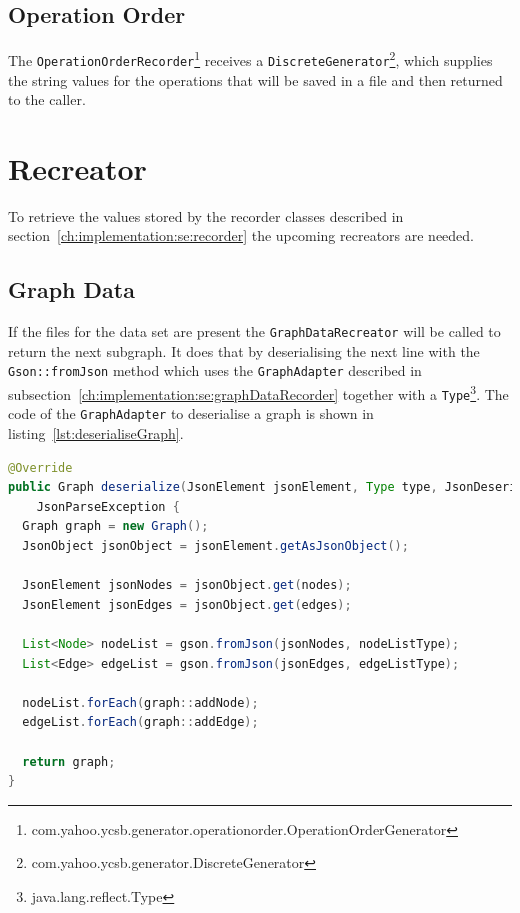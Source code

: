 \subsection{Operation Order}
\label{ch:implementation:se:operationOrderRecorder}
The \texttt{OperationOrderRecorder}\footnote{com.yahoo.ycsb.generator.operationorder.OperationOrderGenerator} receives a \texttt{DiscreteGenerator}\footnote{com.yahoo.ycsb.generator.DiscreteGenerator},
which supplies the string values for the operations that will be saved in a file and then returned to the caller.

\section{Recreator}
\label{ch:implementation:se:recreator}
To retrieve the values stored by the recorder classes described in section~\ref{ch:implementation:se:recorder} the upcoming recreators are needed.

\subsection{Graph Data}
If the files for the data set are present the \texttt{GraphDataRecreator} will be called to return the next subgraph.
It does that by deserialising the next line with the \texttt{Gson::fromJson} method which uses the \texttt{GraphAdapter} described in subsection~\ref{ch:implementation:se:graphDataRecorder} together with a \texttt{Type}\footnote{java.lang.reflect.Type}.
The code of the \texttt{GraphAdapter} to deserialise a graph is shown in listing~\ref{lst:deserialiseGraph}.

\begin{lstlisting}[language=Java,label={lst:deserialiseGraph},caption={Deserialisation of a graph object.},captionpos=b]
@Override
public Graph deserialize(JsonElement jsonElement, Type type, JsonDeserializationContext context) throws
    JsonParseException {
  Graph graph = new Graph();
  JsonObject jsonObject = jsonElement.getAsJsonObject();

  JsonElement jsonNodes = jsonObject.get(nodes);
  JsonElement jsonEdges = jsonObject.get(edges);

  List<Node> nodeList = gson.fromJson(jsonNodes, nodeListType);
  List<Edge> edgeList = gson.fromJson(jsonEdges, edgeListType);

  nodeList.forEach(graph::addNode);
  edgeList.forEach(graph::addEdge);

  return graph;
}
\end{lstlisting}

